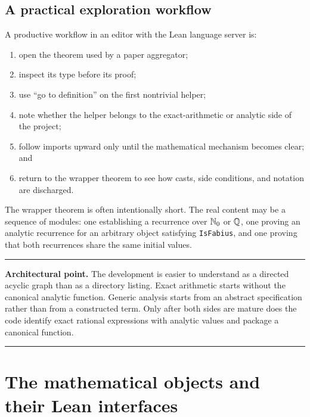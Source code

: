 \documentclass[11pt,oneside]{article}
\theoremstyle{definition}
\theoremstyle{remark}
\newenvironment{boxedremark}{%
  \par\smallskip\noindent\begin{center}\begin{minipage}{0.94\textwidth}%
  \color{black}\hrule\vspace{0.6em}\small
}{%
  \vspace{0.6em}\hrule\end{minipage}\end{center}\smallskip
}
\begin{document}
\subsection{A practical exploration workflow}
A productive workflow in an editor with the Lean language server is:
\begin{enumerate}
  \item open the theorem used by a paper aggregator;
  \item inspect its type before its proof;
  \item use ``go to definition'' on the first nontrivial helper;
  \item note whether the helper belongs to the exact-arithmetic or analytic side of the project;
  \item follow imports upward only until the mathematical mechanism becomes clear; and
  \item return to the wrapper theorem to see how casts, side conditions, and notation are discharged.
\end{enumerate}
The wrapper theorem is often intentionally short.  The real content may be a sequence of modules: one establishing a recurrence over \(\mathbb{N}_{0}\) or \(\mathbb{Q}\), one proving an analytic recurrence for an arbitrary object satisfying \nolinkurl{IsFabius}, and one proving that both recurrences share the same initial values.

\begin{boxedremark}\textbf{Architectural point.}\space
The development is easier to understand as a directed acyclic graph than as a directory listing.  Exact arithmetic starts without the canonical analytic function.  Generic analysis starts from an abstract specification rather than from a constructed term.  Only after both sides are mature does the code identify exact rational expressions with analytic values and package a canonical function.
\end{boxedremark}

\section{The mathematical objects and their Lean interfaces}\label{ch:objects}
\end{document}
